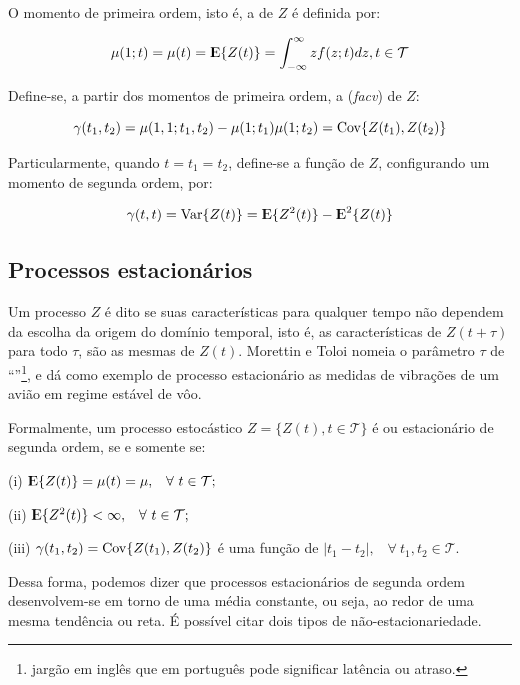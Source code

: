 O momento de primeira ordem, isto é, a  de $Z$ é definida por: 

\begin{equation}\label{series:2.5}
\mu(1; t) = \mu(t) = {\rm I\kern-.3em E}\{Z(t)\} = \int_{-\infty}^{\infty} z f(z;t)dz, t \in \mathcal{T}
\end{equation}

Define-se, a partir dos momentos de primeira ordem, a  (\emph{facv}) de $Z$:

\begin{equation}\label{series:2.6}
\gamma(t_1, t_2) = \mu(1,1; t_1,t_2) - \mu(1; t_1)\mu(1; t_2) = \mathrm{Cov}\{Z(t_1),Z(t_2)\}
\end{equation}

Particularmente, quando $t = t_1 = t_2$, define-se a função  de $Z$, configurando um momento de segunda ordem, por:

\begin{equation}\label{series:2.7}
\gamma(t, t) = \mathrm{Var}\{Z(t)\} = {\rm I\kern-.3em E}\{Z^2(t)\} - {\rm I\kern-.3em E}^2\{Z(t)\}
\end{equation}

\subsection{Processos estacionários}

Um processo $Z$ é dito  se suas características para qualquer tempo não dependem da escolha da origem do domínio temporal, isto é, as características de $Z(t + \tau)$ para todo $\tau$, são as mesmas de $Z(t)$. Morettin e Toloi \citep{morettin} nomeia o parâmetro $\tau$ de ``''\footnote{jargão em inglês que em português pode significar latência ou atraso.}, e dá como exemplo de processo estacionário as medidas de vibrações de um avião em regime estável de vôo.

Formalmente, um processo estocástico $Z = \{Z(t), t \in \mathcal{T}\}$ é  ou estacionário de segunda ordem, se e somente se:

	(i) ${\rm I\kern-.3em E}\{Z(t)\} = \mu(t) = \mu, \;\;\; \forall ~ t \in \mathcal{T};$

	(ii) ${\rm I\kern-.3em E}\{Z^2(t)\} < \infty, \;\;\; \forall ~ t \in \mathcal{T};$

	(iii) $\gamma(t_1, t_2) = \mathrm{Cov}\{Z(t_1), Z(t_2)\}$ é uma função de $|t_1 - t_2|, \;\;\; \forall~ t_1, t_2 \in \mathcal{T}.$

Dessa forma, podemos dizer que processos estacionários de segunda ordem desenvolvem-se em torno de uma média constante, ou seja, ao redor de uma mesma tendência ou reta. É possível citar dois tipos de não-estacionariedade. 

